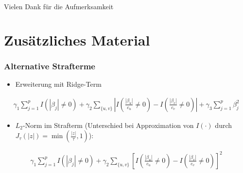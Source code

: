 \documentclass{beamer}
\begin{document}
\begin{frame}
Vielen Dank für die Aufmerksamkeit
\end{frame}


\section{Zusätzliches Material}

\begin{frame}
	\frametitle{Alternative Strafterme}
	\begin{itemize}
	\item Erweiterung mit Ridge-Term
	\end{itemize}
	\begin{align*}
	\gamma_1 \sum_{j=1}^{p}I(|\beta_j|\neq 0) + \gamma_2 \sum_{\{u,v\}}\left| I\left( \frac{|\beta_u|}{c_u} \neq 0 \right) - I\left( \frac{|\beta_v|}{c_v} \neq 0 \right) \right| + \gamma_3\sum_{j=1}^{p}\beta_j^2
	\end{align*}
	\begin{itemize}
	\item $L_2$-Norm im Strafterm (Unterschied bei Approximation von $I(\cdot)$ durch $J_\tau(|z|)=\min (\frac{|z|}{\tau}, 1)$):
	\end{itemize}
	\begin{align*}
	\gamma_1 \sum_{j=1}^{p}I(|\beta_j|\neq 0) + \gamma_2 \sum_{\{u,v\}}\left[ I\left( \frac{|\beta_u|}{c_u} \neq 0 \right) - I\left( \frac{|\beta_v|}{c_v} \neq 0 \right) \right]^2
	\end{align*}
\end{frame}
\end{document}
